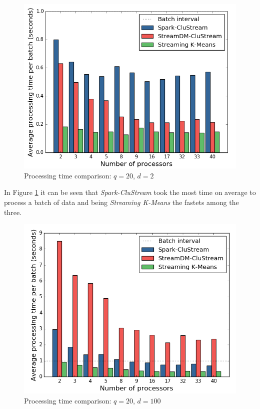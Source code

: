 \documentclass[10pt, conference, compsocconf]{IEEEtran}
\begin{document}
\begin{figure}[h!]
 \centering
 \includegraphics[scale=0.45]{./styles/perfComp2.png}
 \caption{Processing time comparison: $q=20$, $d=2$}
 \label{fig:perfComp2}
\end{figure}

In Figure \ref{fig:perfComp2} it can be seen that \textit{Spark-CluStream} took the most time on average to process a batch of data and being \textit{Streaming K-Means} the fastets among the three. 

\begin{figure}[h!]
 \centering
 \includegraphics[scale=0.45]{./styles/perfComp100.png}
 \caption{Processing time comparison: $q=20$, $d=100$}
 \label{fig:perfComp100}
\end{figure}
\end{document}
